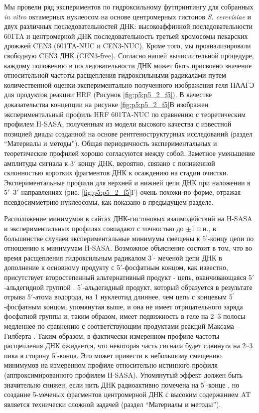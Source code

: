 Мы провели ряд экспериментов по гидроксильному футпринтингу для собранных \textit{in vitro} октамерных нуклеосом  на основе центромерных гистонов \textit{S. cerevisiae} и двух различных последовательностей ДНК: высокоаффинной последовательности 601TA и центромерной ДНК последовательность третьей хромосомы пекарских дрожжей CEN3 (601TA-NUC и CEN3-NUC). Кроме того, мы проанализировали свободную CEN3 ДНК (CEN3-free). Согласно нашей вычислительной процедуре, каждому положению в последовательности ДНК может быть присвоено значение относительной частоты расщепления гидроксильными радикалами путем количественной оценки экспериментально полученного изображения геля ПААГЭ для продуктов реакции HRF (Рисунок \ref{fig:p5:p5_2_f5}). В качестве доказательства концепции на рисунке \ref{fig:p5:p5_2_f5}В изображен экспериментальный профиль HRF 601TA-NUC  по сравнению с теоретическим профилем H-SASA, полученным из модели высокого качества с известной позицией диады созданной на основе рентгеноструктурных исследований (раздел ``Материалы и методы''). Общая периодичность экспериментальных и теоретические профилей хорошо согласуются между собой. Заметное уменьшение амплитуды сигнала к 3$\prime$ концу ДНК, вероятно, связано с пониженной склонностью коротких фрагментов ДНК к осаждению на стадии очистки. Экспериментальные профили для верхней и нижней цепи ДНК при наложении в 5$\prime$–3$\prime$ направлениях (рис. \ref{fig:p5:p5_2_f5}Г) очень похожи по форме, отражая псевдосимметрию нуклеосомы, как показано в предыдущем разделе.

Расположение минимумов в сайтах ДНК-гистоновых взаимодействий на H-SASA и экспериментальных профилях совпадают с точностью до $\pm$1 п.н., в большинстве случаев экспериментальные минимумы смещены к 5$^\prime$-концу цепи по отношению к минимумам H-SASA. Возможное объяснение состоит в том, что во время расщепления гидроксильным радикалом 3$^\prime$- меченой цепи ДНК в дополнение к основному продукту с 5$\prime$-фосфатным концом, как известно, присутствует второстепенный альтернативный продукт - цепь, оканчивающаяся 5$\prime$-альдегидной группой \cite{balasubramanian_dna_1998}. 5$^\prime$-альдегидный продукт, который образуется в результате отрыва 5$\prime$-атома водорода, на 1 нуклеотид длиннее, чем цепь с концевым 5$^\prime$-фосфатным концом, упомянутая выше, и она не имеет отрицательного заряда фосфатной группы и, таким образом, имеет подвижность в геле на 2–3 полосы медленнее по сравнению с соответствующим продуктами реакций Максама – Гилберта \cite{kappen_deoxyribonucleic_1983}. Таким образом, в фактически измеренном профиле частоты расщепления ДНК ожидается, что некоторая часть сигнала будет сдвинута на 2–3 пика в сторону 5$^\prime$-конца. Это может привести к небольшому смещению минимумов на измеренном профиле относительно истинного профиля (аппроксимированного профилем H-SASA). Упомянутый эффект должен быть значительно снижен, если нить ДНК радиоактивно помечена на 5$^\prime$-конце \cite{balasubramanian_dna_1998}, но создание 5-меченых фрагментов центромерной ДНК с высоким содержанием AT является технически сложной задачей (раздел ``Материалы и методы'').

